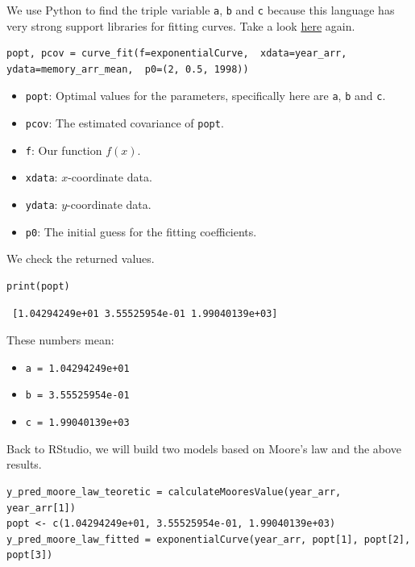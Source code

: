 \documentclass[a4paper]{article}
\begin{document}
We use Python to find the triple variable \verb|a|, \verb|b| and \verb|c| because this language has very strong support libraries for fitting curves. Take a look \href{https://colab.research.google.com/drive/1ixVXEsUy2YtcCrayuPR6mmMf80pT92nh#scrollTo=ZXG4Ws3mTTNT}{here} again.
\begin{mdframed}[leftline=false,rightline=false,backgroundcolor=lightblue!10,nobreak=false]
    \begin{verbatim}
popt, pcov = curve_fit(f=exponentialCurve,  xdata=year_arr, ydata=memory_arr_mean,  p0=(2, 0.5, 1998))
    \end{verbatim}
\end{mdframed}
\begin{itemize}
    \item \verb|popt|: Optimal values for the parameters, specifically here are \verb|a|, \verb|b| and \verb|c|.
    \item \verb|pcov|: The estimated covariance of \verb|popt|.
    \item \verb|f|: Our function $f(x)$.
    \item \verb|xdata|: $x$-coordinate data.
    \item \verb|ydata|: $y$-coordinate data.
    \item \verb|p0|: The initial guess for the fitting coefficients.
\end{itemize}
We check the returned values.
\begin{mdframed}[leftline=false,rightline=false,backgroundcolor=lightblue!10,nobreak=false]
    \begin{verbatim}
print(popt)
    \end{verbatim}
\end{mdframed}
\begin{lstlisting}
 [1.04294249e+01 3.55525954e-01 1.99040139e+03]
\end{lstlisting}
These numbers mean:
\begin{itemize}
    \item \verb|a = 1.04294249e+01| 
    \item \verb|b = 3.55525954e-01| 
    \item \verb|c = 1.99040139e+03| 
\end{itemize}
Back to RStudio, we will build two models based on Moore's law and the above results.
\begin{mdframed}[leftline=false,rightline=false,backgroundcolor=lightblue!10,nobreak=false]
    \begin{verbatim}
y_pred_moore_law_teoretic = calculateMooresValue(year_arr, year_arr[1])
popt <- c(1.04294249e+01, 3.55525954e-01, 1.99040139e+03)
y_pred_moore_law_fitted = exponentialCurve(year_arr, popt[1], popt[2], popt[3])
    \end{verbatim}
\end{mdframed}
\end{document}

